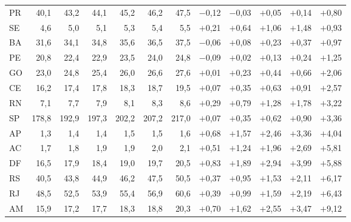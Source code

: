 \begin{tabular}{@{}l*{11}{r}@{}}
PR & 40,1 & 43,2 & 44,1 & 45,2 & 46,2 & 47,5 & $-$0,12 & $-$0,03 & $+$0,05 & $+$0,14 & $+$0,80 \\
SE & 4,6 & 5,0 & 5,1 & 5,3 & 5,4 & 5,5 & $+$0,21 & $+$0,64 & $+$1,06 & $+$1,48 & $+$0,93 \\
BA & 31,6 & 34,1 & 34,8 & 35,6 & 36,5 & 37,5 & $-$0,06 & $+$0,08 & $+$0,23 & $+$0,37 & $+$0,97 \\
PE & 20,8 & 22,4 & 22,9 & 23,5 & 24,0 & 24,8 & $-$0,09 & $+$0,02 & $+$0,13 & $+$0,24 & $+$1,25 \\
GO & 23,0 & 24,8 & 25,4 & 26,0 & 26,6 & 27,6 & $+$0,01 & $+$0,23 & $+$0,44 & $+$0,66 & $+$2,06 \\
CE & 16,2 & 17,4 & 17,8 & 18,3 & 18,7 & 19,5 & $+$0,07 & $+$0,35 & $+$0,63 & $+$0,91 & $+$2,57 \\
RN & 7,1 & 7,7 & 7,9 & 8,1 & 8,3 & 8,6 & $+$0,29 & $+$0,79 & $+$1,28 & $+$1,78 & $+$3,22 \\
SP & 178,8 & 192,9 & 197,3 & 202,2 & 207,2 & 217,0 & $+$0,07 & $+$0,35 & $+$0,62 & $+$0,90 & $+$3,36 \\
AP & 1,3 & 1,4 & 1,4 & 1,5 & 1,5 & 1,6 & $+$0,68 & $+$1,57 & $+$2,46 & $+$3,36 & $+$4,04 \\
AC & 1,7 & 1,8 & 1,9 & 1,9 & 2,0 & 2,1 & $+$0,51 & $+$1,24 & $+$1,96 & $+$2,69 & $+$5,81 \\
DF & 16,5 & 17,9 & 18,4 & 19,0 & 19,7 & 20,5 & $+$0,83 & $+$1,89 & $+$2,94 & $+$3,99 & $+$5,88 \\
RS & 40,5 & 43,8 & 44,9 & 46,2 & 47,5 & 50,5 & $+$0,37 & $+$0,95 & $+$1,53 & $+$2,11 & $+$6,17 \\
RJ & 48,5 & 52,5 & 53,9 & 55,4 & 56,9 & 60,6 & $+$0,39 & $+$0,99 & $+$1,59 & $+$2,19 & $+$6,43 \\
AM & 15,9 & 17,2 & 17,7 & 18,3 & 18,8 & 20,3 & $+$0,70 & $+$1,62 & $+$2,55 & $+$3,47 & $+$9,12 \\
\bottomrule
\end{tabular}
